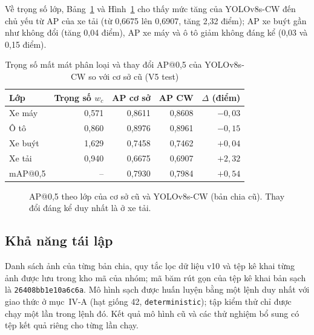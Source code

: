 \documentclass[10pt,journal,letterpaper]{IEEEtran}
\begin{document}
Về trọng số lớp, Bảng~\ref{tab:w} và Hình~\ref{fig:cls} cho thấy mức tăng của YOLOv8s-CW đến chủ yếu từ AP của xe tải (từ 0,6675 lên 0,6907, tăng 2,32 điểm); AP xe buýt gần như không đổi (tăng 0,04 điểm), AP xe máy và ô tô giảm không đáng kể (0,03 và 0,15 điểm).

\begin{table}[!t]
\caption{Trọng số mất mát phân loại và thay đổi AP@0,5 của YOLOv8s-CW so với cơ sở cũ (V5 test)}
\label{tab:w}
\centering
\footnotesize
\begin{tabular}{lrrrr}
\toprule
Lớp & Trọng số $w_c$ & AP cơ sở & AP CW & $\Delta$ (điểm) \\
\midrule
Xe máy & 0,571 & 0,8611 & 0,8608 & $-0{,}03$ \\
Ô tô & 0,860 & 0,8976 & 0,8961 & $-0{,}15$ \\
Xe buýt & 1,629 & 0,7458 & 0,7462 & $+0{,}04$ \\
Xe tải & 0,940 & 0,6675 & 0,6907 & $+2{,}32$ \\
\midrule
mAP@0,5 & -- & 0,7930 & 0,7984 & $+0{,}54$ \\
\bottomrule
\end{tabular}
\end{table}

\begin{figure}[!t]
\centering
{}
\caption{AP@0,5 theo lớp của cơ sở cũ và YOLOv8s-CW (bản chia cũ). Thay đổi đáng kể duy nhất là ở xe tải.}
\label{fig:cls}
\end{figure}

\subsection{Khả năng tái lập}
Danh sách ảnh của từng bản chia, quy tắc lọc dữ liệu v10 và tệp kê khai từng ảnh được lưu trong kho mã của nhóm; mã băm rút gọn của tệp kê khai bản sạch là \texttt{26408bb1e10a6c6a}. Mô hình sạch được huấn luyện bằng một lệnh duy nhất với giao thức ở mục~IV-A (hạt giống 42, \texttt{deterministic}); tập kiểm thử chỉ được chạy một lần trong lệnh đó. Kết quả mô hình cũ và các thử nghiệm bổ sung có tệp kết quả riêng cho từng lần chạy.
\end{document}
